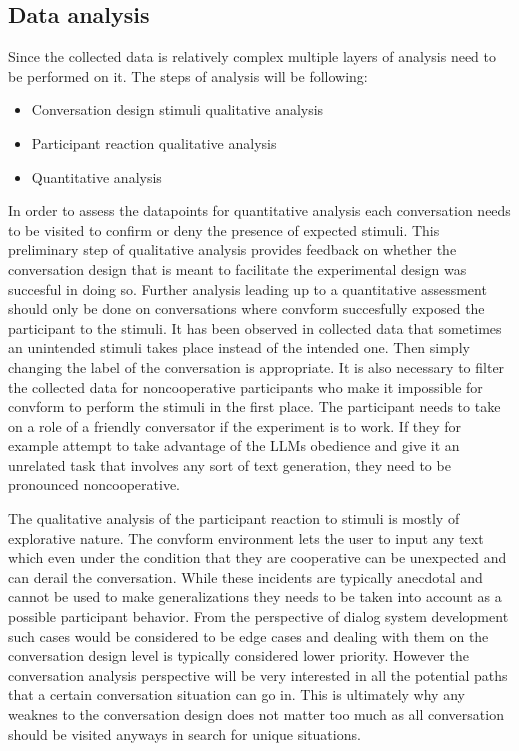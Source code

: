 \documentclass[12pt]{report}
\begin{document}
{\subsection{Data analysis}

Since the collected data is relatively complex
multiple layers of analysis need to be performed on it.
The steps of analysis will be following:

\begin{itemize}
\item{Conversation design stimuli qualitative analysis}
\item{Participant reaction qualitative analysis}
\item{Quantitative analysis}
\end{itemize}

In order to assess the datapoints for quantitative analysis
each conversation needs to be visited
to confirm or deny the presence of expected stimuli.
This preliminary step of qualitative analysis
provides feedback on whether the conversation design
that is meant to facilitate the experimental design
was succesful in doing so.
Further analysis leading up to a quantitative assessment
should only be done on conversations
where convform succesfully exposed the participant to the stimuli.
It has been observed in collected data
that sometimes an unintended stimuli
takes place instead of the intended one.
Then simply changing the label of the conversation is appropriate.
It is also necessary to filter the collected data for
noncooperative participants who make it impossible for convform
to perform the stimuli in the first place.
The participant needs to take on a role of a friendly conversator
if the experiment is to work.
If they for example attempt to take advantage of the LLMs obedience
and give it an unrelated task that involves any sort of text generation,
they need to be pronounced noncooperative.

The qualitative analysis of the participant reaction to stimuli
is mostly of explorative nature.
The convform environment lets the user to input any text
which even under the condition that they are cooperative
can be unexpected and can derail the conversation.
While these incidents are typically anecdotal
and cannot be used to make generalizations
they needs to be taken into account
as a possible participant behavior.
From the perspective of dialog system development
such cases would be considered to be edge cases
and dealing with them on the conversation design level
is typically considered lower priority.
However the conversation analysis perspective
will be very interested in all the potential paths that
a certain conversation situation can go in.
This is ultimately why any weaknes to the conversation design
does not matter too much
as all conversation should be visited anyways
in search for unique situations.

}
\end{document}
